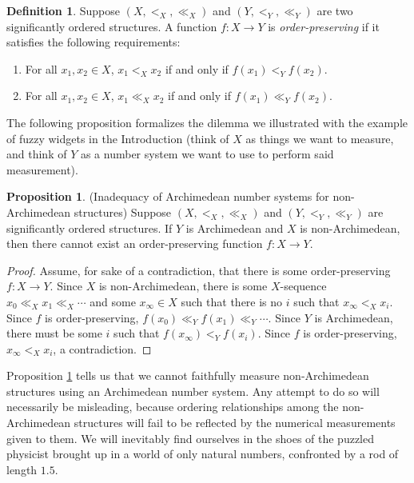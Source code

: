 \documentclass[reqno]{article}
\theoremstyle{definition}
\newtheorem{proposition}[theorem]{Proposition}
\newtheorem{definition}{Definition}
\begin{document}
\begin{definition}
    Suppose $(X,<_X,\ll_X)$ and $(Y,<_Y,\ll_Y)$
    are two significantly ordered structures.
    A function $f:X\to Y$ is \emph{order-preserving} if it satisfies the following
    requirements:
    \begin{enumerate}
        \item
            For all $x_1,x_2\in X$, $x_1<_X x_2$ if and only if $f(x_1)<_Yf(x_2)$.
        \item
            For all $x_1,x_2\in X$, $x_1\ll_X x_2$ if and only if
            $f(x_1)\ll_Yf(x_2)$.
    \end{enumerate}
\end{definition}

The following proposition formalizes the dilemma we illustrated with the
example of fuzzy widgets in the Introduction (think of $X$ as things we
want to measure, and think of $Y$ as a number system we want to use to
perform said measurement).

\begin{proposition}
\label{maindilemma}
(Inadequacy of Archimedean number systems for non-Archimedean structures)
    Suppose $(X,<_X,\ll_X)$ and $(Y,<_Y,\ll_Y)$
    are significantly ordered structures.
    If $Y$ is Archimedean and $X$ is non-Archimedean, then there cannot exist
    an order-preserving function $f:X\to Y$.
\end{proposition}

\begin{proof}
    Assume, for sake of a contradiction, that there is some order-preserving
    $f:X\to Y$.
    Since $X$ is non-Archimedean, there is some $X$-sequence
    $x_0\ll_X x_1\ll_X \cdots$ and some
    $x_\infty\in X$ such that there is no $i$ such that $x_\infty<_X x_i$.
    Since $f$ is order-preserving,
    $f(x_0)\ll_Y f(x_1) \ll_Y \cdots$.
    Since $Y$ is Archimedean, there must be some $i$ such that
    $f(x_\infty)<_Y f(x_i)$.
    Since $f$ is order-preserving, $x_\infty<_X x_i$, a contradiction.
\end{proof}

Proposition \ref{maindilemma} tells us that we cannot faithfully measure
non-Archimedean structures using an Archimedean number system.
Any attempt to do so will necessarily be misleading, because ordering
relationships among the non-Archimedean structures will fail to be reflected
by the numerical measurements given to them.
We will inevitably find ourselves in the shoes of the puzzled physicist
brought up in a world of only natural numbers, confronted by a rod of
length $1.5$.
\end{document}

